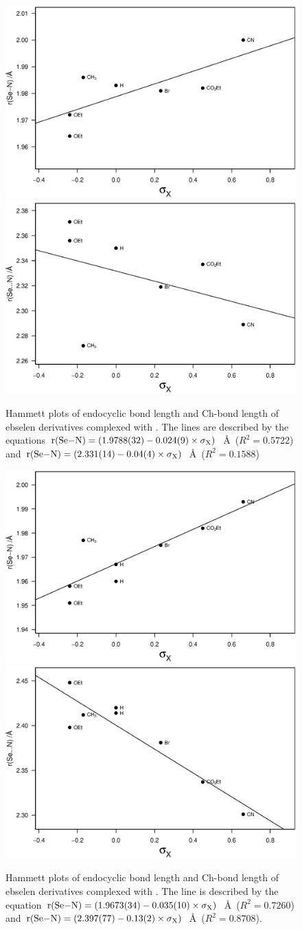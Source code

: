 \begin{refsection}
\begin{figure}
    \centering
    \includegraphics[width=0.48\linewidth]{Figures/hammett-endo-pyrrol.eps}
    \includegraphics[width=0.48\linewidth]{Figures/hammett-pyrrol.eps}
    \caption{Hammett plots of endocyclic  bond length and  Ch-bond length of ebselen derivatives complexed with . The lines are described by the equations $\mathrm{r}(\ce{Se-N}) = (1.9788(32) - 0.024(9) \times \sigma_{\mathrm{X}})$~\AA~($R^2=0.5722$) and $\mathrm{r}(\ce{Se-N}) = (2.331(14) - 0.04(4) \times \sigma_{\mathrm{X}})$~\AA~($R^2=0.1588$)}
    \label{fig:hammett-pyrrol}
\end{figure}

\begin{figure}
    \centering
    \includegraphics[width=0.48\linewidth]{Figures/hammett-endo-morph.eps}
    \includegraphics[width=0.48\linewidth]{Figures/hammett-morph.eps}
    \caption{Hammett plots of endocyclic  bond length and  Ch-bond length of ebselen derivatives complexed with . The line is described by the equation $\mathrm{r}(\ce{Se-N}) = (1.9673(34) - 0.035(10) \times \sigma_{\mathrm{X}})$~\AA~($R^2=0.7260$) and $\mathrm{r}(\ce{Se-N}) = (2.397(77) - 0.13(2) \times \sigma_{\mathrm{X}})$~\AA~($R^2=0.8708$).}
    \label{fig:hammett-morph}
\end{figure}


\end{refsection}
